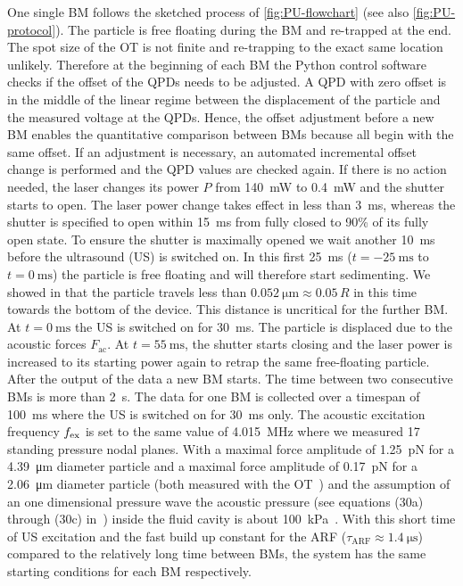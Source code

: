 One single BM follows the sketched process of \cref{fig:PU-flowchart} (see also 
\cref{fig:PU-protocol}). The particle is free floating during the BM and 
re-trapped at the end. The spot size of the OT is not finite and re-trapping to 
the exact same location unlikely. Therefore at the beginning of each BM the 
Python control software checks if the offset of the QPDs needs to be adjusted. 
A QPD with zero offset is in the middle of the linear regime between the 
displacement of the particle and the measured voltage at the QPDs. Hence, the 
offset adjustment before a new BM enables the quantitative comparison between 
BMs because all begin with the same offset. If an adjustment is necessary, an 
automated incremental offset change is performed and the QPD values are checked 
again. If there is no action needed, the laser changes its power $P$ from 
\SI{140}{\milli\watt} to \SI{0.4}{\milli\watt} and the shutter starts to open. 
The laser power change takes effect in less than \SI{3}{\ms}, whereas the 
shutter is specified to open within \SI{15}{\ms} from fully closed to 90\% of 
its fully open state. To ensure the shutter is maximally opened we wait another 
\SI{10}{\ms} before the ultrasound (US) is switched on. In this first 
\SI{25}{\ms} ($t=\SI{-25}{\ms}$ to $t=\SI{0}{\ms}$) the particle is free 
floating and will therefore start sedimenting. We showed in \cite{Goering2021} 
that the particle travels less than $\SI{0.052}{\um}\approx 0.05\,R$ in this 
time towards the bottom of the device. This distance is uncritical for the 
further BM. At $t=\SI{0}{\ms}$ the US is switched on for \SI{30}{\ms}. The 
particle is displaced due to the acoustic forces $F_{\mathrm{ac}}$. At 
$t=\SI{55}{\ms}$, the shutter starts closing and the laser power is increased 
to its starting power again to retrap the same free-floating particle. After 
the output of the data a new BM starts. The time between two consecutive BMs 
is more than \SI{2}{\s}. The data for one BM is collected over a timespan of 
\SI{100}{\ms} where the US is switched on for \SI{30}{\ms} only. The acoustic 
excitation frequency $f_{\mathrm{ex}}$ is set to the same value of \SI{4.015}{\mega\hertz} 
where we measured 17 standing pressure nodal planes. With a maximal force 
amplitude of \SI{1.25}{\pico\newton} for a \SI{4.39}{\um} diameter particle and 
a maximal force amplitude of \SI{0.17}{\pico\newton} for a \SI{2.06}{\um} 
diameter particle (both measured with the OT~\cite{Goering2021}) and the 
assumption of an one dimensional pressure wave the acoustic pressure (see 
equations (30a) through (30c) in~\cite{Bruus2012}) inside the fluid cavity is 
about \SI{100}{\kilo\pascal}~\cite{Goering2021}. With this short time of US 
excitation and the fast build up constant for the ARF 
($\tau_{\mathrm{ARF}}\approx \SI{1.4}{\us}$) compared to the relatively long 
time between BMs, the system has the same starting conditions for each BM 
respectively.

